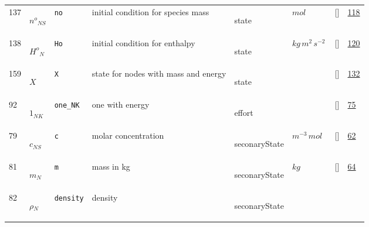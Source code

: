 \begin{longtable}{|p{1cm}|p{3cm}|p{3cm}|p{7cm}|p{3.0cm}|p{3cm}|p{2cm}|p{1cm}|}
    137
             & \hypertarget{"v:137"}{ $ {n^{o}}{_{{N S}}} $}
             & \verb|no|
             & initial condition for species mass
             & \begin{lay}state \end{lay}
             & $ mol \, $
             & []
             & \hyperlink{"e:118"}{ 118 }
                 \\
    138
             & \hypertarget{"v:138"}{ $ {H^{o}}{_{N}} $}
             & \verb|Ho|
             & initial condition for enthalpy
             & \begin{lay}state \end{lay}
             & $ kg \,m^{2} \,s^{-2} \, $
             & []
             & \hyperlink{"e:120"}{ 120 }
                 \\
    159
             & \hypertarget{"v:159"}{ $ {X}{_{}} $}
             & \verb|X|
             & state for nodes with mass and energy
             & \begin{lay}state \end{lay}
             & $  $
             & []
             & \hyperlink{"e:132"}{ 132 }
                 \\
    92
             & \hypertarget{"v:92"}{ $ {1}{_{{N K}}} $}
             & \verb|one_NK|
             & one with energy
             & \begin{lay}effort \end{lay}
             & $  $
             & []
             & \hyperlink{"e:75"}{ 75 }
                 \\
    79
             & \hypertarget{"v:79"}{ $ {c}{_{{N S}}} $}
             & \verb|c|
             & molar concentration
             & \begin{lay}seconaryState \end{lay}
             & $ m^{-3} \,mol \, $
             & []
             & \hyperlink{"e:62"}{ 62 }
                 \\
    81
             & \hypertarget{"v:81"}{ $ {m}{_{N}} $}
             & \verb|m|
             & mass in kg
             & \begin{lay}seconaryState \end{lay}
             & $ kg \, $
             & []
             & \hyperlink{"e:64"}{ 64 }
                 \\
    82
             & \hypertarget{"v:82"}{ $ {\rho}{_{N}} $}
             & \verb|density|
             & density
             & \begin{lay}seconaryState \end{lay}

\end{longtable}
